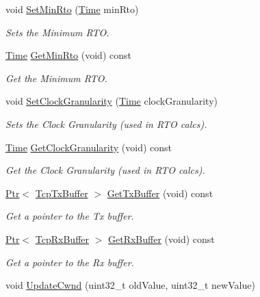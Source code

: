 \begin{DoxyCompactItemize}
void \hyperlink{classns3_1_1TcpSocketBase_af99b7fe3341051dead8b4e26a5b2c12b}{Set\+Min\+Rto} (\hyperlink{classns3_1_1Time}{Time} min\+Rto)
\begin{DoxyCompactList}\small\item\em Sets the Minimum R\+TO. \end{DoxyCompactList}\item 
\hyperlink{classns3_1_1Time}{Time} \hyperlink{classns3_1_1TcpSocketBase_a7a2d5935f65b598dba9e2c01506cdbb3}{Get\+Min\+Rto} (void) const 
\begin{DoxyCompactList}\small\item\em Get the Minimum R\+TO. \end{DoxyCompactList}\item 
void \hyperlink{classns3_1_1TcpSocketBase_a9164b842ec64a11e42f5b5e87cb2cecc}{Set\+Clock\+Granularity} (\hyperlink{classns3_1_1Time}{Time} clock\+Granularity)
\begin{DoxyCompactList}\small\item\em Sets the Clock Granularity (used in R\+TO calcs). \end{DoxyCompactList}\item 
\hyperlink{classns3_1_1Time}{Time} \hyperlink{classns3_1_1TcpSocketBase_a4c47e3add9c7e8023884e0df5a88c489}{Get\+Clock\+Granularity} (void) const 
\begin{DoxyCompactList}\small\item\em Get the Clock Granularity (used in R\+TO calcs). \end{DoxyCompactList}\item 
\hyperlink{classns3_1_1Ptr}{Ptr}$<$ \hyperlink{classns3_1_1TcpTxBuffer}{Tcp\+Tx\+Buffer} $>$ \hyperlink{classns3_1_1TcpSocketBase_aea4dd16496e03e7cc96d0ed8c51256fa}{Get\+Tx\+Buffer} (void) const 
\begin{DoxyCompactList}\small\item\em Get a pointer to the Tx buffer. \end{DoxyCompactList}\item 
\hyperlink{classns3_1_1Ptr}{Ptr}$<$ \hyperlink{classns3_1_1TcpRxBuffer}{Tcp\+Rx\+Buffer} $>$ \hyperlink{classns3_1_1TcpSocketBase_a4107fd640582c5e35641994386e11b55}{Get\+Rx\+Buffer} (void) const 
\begin{DoxyCompactList}\small\item\em Get a pointer to the Rx buffer. \end{DoxyCompactList}\item 
void \hyperlink{classns3_1_1TcpSocketBase_af45fbd60c8ccde3357801e31e93e163d}{Update\+Cwnd} (uint32\+\_\+t old\+Value, uint32\+\_\+t new\+Value)

\end{DoxyCompactItemize}

